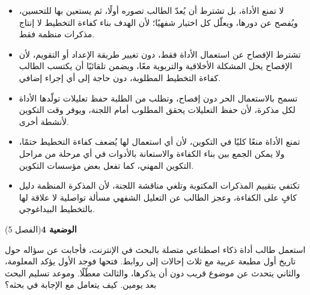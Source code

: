 \documentclass[11pt,a4paper]{article}
\begin{document}
\begin{itemize}[leftmargin=1.0cm, labelsep=6pt, itemsep=3pt, topsep=4pt, parsep=0pt]
  \item[\textbf{أ)}] لا تمنع الأداة، بل تشترط أن يُعدّ الطالب تصوره أولًا، ثم يستعين بها للتحسين، ويُفصح عن دورها، ويعلّل كل اختيار شفهيًا؛ لأن الهدف بناء كفاءة التخطيط لا إنتاج مذكرات منظمة فقط.
  \item[\textbf{ب)}] تشترط الإفصاح عن استعمال الأداة فقط، دون تغيير طريقة الإعداد أو التقويم، لأن الإفصاح يحل المشكلة الأخلاقية والتربوية معًا، ويضمن تلقائيًا أن يكتسب الطالب كفاءة التخطيط المطلوبة، دون حاجة إلى أي إجراء إضافي.
  \item[\textbf{ج)}] تسمح بالاستعمال الحر دون إفصاح، وتطلب من الطلبة حفظ تعليلات تولّدها الأداة لكل مذكرة، لأن حفظ التعليلات يحقق المطلوب أمام اللجنة، ويوفر وقت التكوين لأنشطة أخرى.
  \item[\textbf{د)}] تمنع الأداة منعًا كليًا في التكوين، لأن أي استعمال لها يُضعف كفاءة التخطيط حتمًا، ولا يمكن الجمع بين بناء الكفاءة والاستعانة بالأدوات في أي مرحلة من مراحل التكوين المهني، كما تفعل بعض مؤسسات التكوين.
  \item[\textbf{هـ)}] تكتفي بتقييم المذكرات المكتوبة وتلغي مناقشة اللجنة، لأن المذكرة المنظمة دليل كافٍ على الكفاءة، وعجز الطالب عن التعليل الشفهي مسألة تواصلية لا علاقة لها بالتخطيط البيداغوجي.
\end{itemize}
\par\vspace{6pt}
\noindent
{\large\khatt\textbf{الوضعية 4}}\hfill{\small(الفصل 5)}\par\nopagebreak\vspace{3pt}
\setlength{\fboxsep}{7pt}\colorbox{gray!10}{\parbox{\dimexpr\linewidth-14pt}{استعمل طالب أداة ذكاء اصطناعي متصلة بالبحث في الإنترنت، فأجابت عن سؤاله حول تاريخ أول مطبعة عربية مع ثلاث إحالات إلى روابط. فتحها فوجد الأول يؤكد المعلومة، والثاني يتحدث عن موضوع قريب دون أن يذكرها، والثالث معطّلًا. وموعد تسليم البحث بعد يومين. كيف يتعامل مع الإجابة في بحثه؟}}\par\nopagebreak
\end{document}
